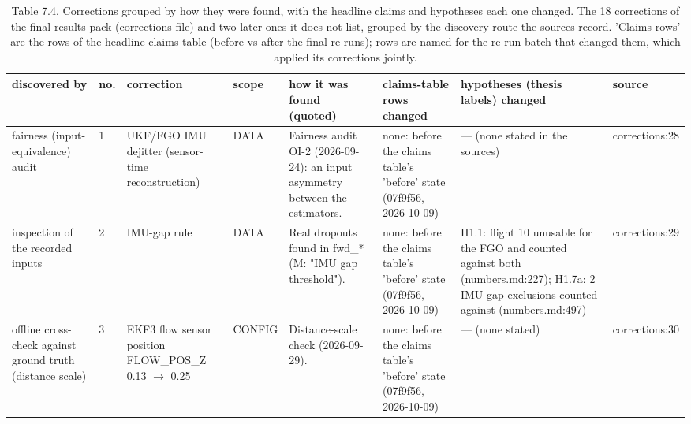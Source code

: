 \begin{table}[htbp]
\centering
\scriptsize
\caption{Table 7.4. Corrections grouped by how they were found, with the headline claims and hypotheses each one changed. The 18 corrections of the final results pack (corrections file) and two later ones it does not list, grouped by the discovery route the sources record. 'Claims rows' are the rows of the headline-claims table (before vs after the final re-runs); rows are named for the re-run batch that changed them, which applied its corrections jointly.}
\label{tab:7-4}
\begin{tabular}{p{}p{}p{}p{}p{}p{}p{}p{}}
\toprule
\textbf{discovered by} & \textbf{no.} & \textbf{correction} & \textbf{scope} & \textbf{how it was found (quoted)} & \textbf{claims-table rows changed} & \textbf{hypotheses (thesis labels) changed} & \textbf{source} \\
\midrule
fairness (input-equivalence) audit & 1 & UKF/FGO IMU dejitter (sensor-time reconstruction) & DATA & Fairness audit OI-2 (2026-09-24): an input asymmetry between the estimators. & none: before the claims table's 'before' state (07f9f56, 2026-10-09) & --- (none stated in the sources) & corrections:28 \\
inspection of the recorded inputs & 2 & IMU-gap rule & DATA & Real dropouts found in fwd\_* (M: "IMU gap threshold"). & none: before the claims table's 'before' state (07f9f56, 2026-10-09) & H1.1: flight 10 unusable for the FGO and counted against both (numbers.md:227); H1.7a: 2 IMU-gap exclusions counted against (numbers.md:497) & corrections:29 \\
offline cross-check against ground truth (distance scale) & 3 & EKF3 flow sensor position FLOW\_POS\_Z 0.13 $\rightarrow$ 0.25 & CONFIG & Distance-scale check (2026-09-29). & none: before the claims table's 'before' state (07f9f56, 2026-10-09) & --- (none stated) & corrections:30 \\

\end{tabular}
\end{table}
